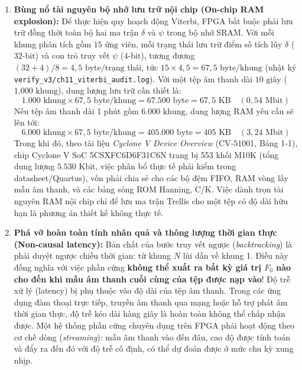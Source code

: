 \begin{enumerate}
    \item \textbf{Bùng nổ tài nguyên bộ nhớ lưu trữ nội chip (On-chip RAM explosion):}
    Để thực hiện quy hoạch động Viterbi, FPGA bắt buộc phải lưu trữ đồng thời toàn bộ hai ma trận $\delta$ và $\psi$ trong bộ nhớ SRAM. Với mỗi khung phân tích gồm $15\text{ ứng viên}$, mỗi trạng thái lưu trữ điểm số tích lũy $\delta$ ($32\text{-bit}$) và con trỏ truy vết $\psi$ ($4\text{-bit}$), tương đương $(32 + 4) / 8 = 4{,}5\text{ byte/trạng thái}$, tức $15 \times 4{,}5 = 67{,}5\text{ byte/khung}$ (nhật ký \texttt{verify\_v3/ch11\_viterbi\_audit.log}). Với một tệp âm thanh dài $10\text{ giây}$ ($1.000\text{ khung}$), dung lượng lưu trữ cần thiết là:
    \begin{equation}
        1.000\text{ khung} \times 67{,}5\text{ byte/khung} = 67.500\text{ byte} = 67{,}5\text{ KB} \quad (0{,}54\text{ Mbit})
    \end{equation}
    Nếu tệp âm thanh dài 1 phút gồm $6.000\text{ khung}$, dung lượng RAM yêu cầu sẽ lên tới:
    \begin{equation}
        6.000\text{ khung} \times 67{,}5\text{ byte/khung} = 405.000\text{ byte} = 405\text{ KB} \quad (3{,}24\text{ Mbit})
    \end{equation}
    Trong khi đó, theo tài liệu \emph{Cyclone V Device Overview} (CV-51001, Bảng 1-1), chip Cyclone V SoC 5CSXFC6D6F31C6N trang bị 553 khối M10K (tổng dung lượng $5.530\text{ Kbit}$, việc phân bổ thực tế phải kiểm trong datasheet/Quartus), vốn phải chia sẻ cho các bộ đệm FIFO, RAM vòng lấy mẫu âm thanh, và các bảng sóng ROM Hanning, C/K. Việc dành trọn tài nguyên RAM nội chip chỉ để lưu ma trận Trellis cho một tệp có độ dài hữu hạn là phương án thiết kế không thực tế.

    \item \textbf{Phá vỡ hoàn toàn tính nhân quả và thông lượng thời gian thực (Non-causal latency):}
    Bản chất của bước truy vết ngược (\emph{backtracking}) là phải duyệt ngược chiều thời gian: từ khung $N$ lùi dần về khung 1. Điều này đồng nghĩa với việc phần cứng \textbf{không thể xuất ra bất kỳ giá trị $F_0$ nào cho đến khi mẫu âm thanh cuối cùng của tệp được nạp vào}!
    Độ trễ xử lý (latency) bị phụ thuộc vào độ dài của tệp âm thanh. Trong các ứng dụng đàm thoại trực tiếp, truyền âm thanh qua mạng hoặc hỗ trợ phát âm thời gian thực, độ trễ kéo dài hàng giây là hoàn toàn không thể chấp nhận được. Một hệ thống phần cứng chuyên dụng trên FPGA phải hoạt động theo cơ chế dòng (\emph{streaming}): mẫu âm thanh vào đến đâu, cao độ được tính toán và đẩy ra đến đó với độ trễ cố định, có thể dự đoán được ở mức chu kỳ xung nhịp.


\end{enumerate}
